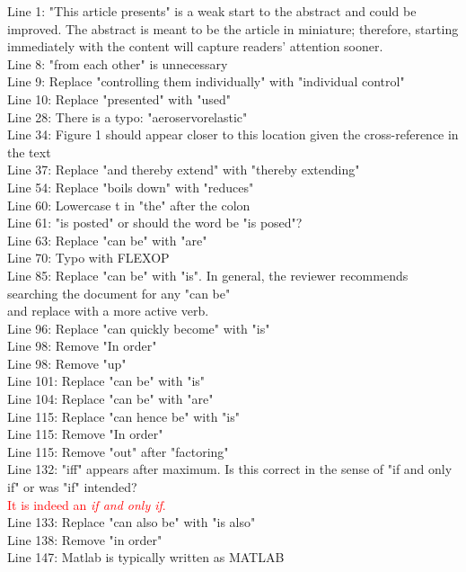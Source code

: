 \documentclass{article}
\begin{document}
\noindent
Line 1: "This article presents" is a weak start to the abstract and could be improved.  The abstract is meant to be the article in miniature; therefore, starting immediately with the content will capture readers' attention sooner.\\
Line 8: "from each other" is unnecessary\\
Line 9: Replace "controlling them individually" with "individual control"\\
Line 10: Replace "presented" with "used"\\
Line 28: There is a typo: "aeroservorelastic"\\
Line 34: Figure 1 should appear closer to this location given the cross-reference in the text\\
Line 37: Replace "and thereby extend" with "thereby extending"\\
Line 54: Replace "boils down" with "reduces"\\
Line 60: Lowercase t in "the" after the colon\\
Line 61: "is posted" or should the word be "is posed"?\\
Line 63: Replace "can be" with "are"\\
Line 70: Typo with FLEXOP\\
Line 85: Replace "can be" with "is".  In general, the reviewer recommends searching the document for any "can be"\\ and replace with a more active verb.\\
Line 96: Replace "can quickly become" with "is"\\
Line 98: Remove "In order"\\
Line 98: Remove "up"\\
Line 101: Replace "can be" with "is"\\
Line 104: Replace "can be" with "are"\\
Line 115: Replace "can hence be" with "is"\\
Line 115: Remove "In order"\\
Line 115: Remove "out" after "factoring"\\
Line 132:  "iff" appears after maximum.  Is this correct in the sense of "if and only if" or was "if" intended?\\
\textcolor{red}{\qquad It is indeed an \textit{if and only if}.} \\
Line 133: Replace "can also be" with "is also"\\
Line 138: Remove "in order"\\
Line 147: Matlab is typically written as MATLAB\\
\end{document}

